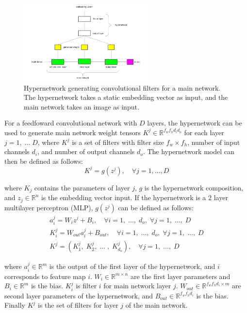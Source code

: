 \begin{figure} [H]
   	\centering
    	\includegraphics[width=0.6\textwidth, height=0.4\textwidth]{hypernetwork.png}
	\caption{Hypernetwork generating convolutional filters for a main network. The hypernetwork takes a static embedding vector as input, and the main network takes an image as input.}
\end{figure}

\noindent For a feedfoward convolutional network with $ D $ layers, the hypernetwork can be used to generate main network weight tensors $ K^j \in \mathbb{R}^{f_wf_hd_id_o} $ for each layer $ j = 1, \; \dots \; D $, where $ K^j $ is a set of filters with filter size $ f_w \times f_h $, number of input channels $ d_i $, and number of output channels $ d_o $. The hypernetwork model can then be defined as follows: 
\begin{equation}
	K^j = g(z^j), \quad \forall j = 1, \dots, D
\end{equation}

\noindent where $ K_j $ contains the parameters of layer $ j $, $ g $ is the hypernetwork composition, and $ z_j \in \mathbb{R}^n $ is the embedding vector input. If the hypernetwork is a $ 2 $ layer multilayer perceptron (MLP), $ g(z^j) $ can be defined as follows:  
\begin{subequations}
	\begin{gather}
		a_i^j = W_iz^j + B_i, \quad \forall i = 1, \; \dots, \; d_o, \; \forall j = 1, \; \dots, \; D \\
		K_i^j = W_{out}a_i^j + B_{out}, \quad \forall i = 1, \; \dots, \; d_o, \; \forall j = 1, \; \dots, \; D \\
		K^j = (K_1^j, \; K_2^j, \; \dots \;, \; K_{d_o}^j), \quad \forall j = 1, \; \dots, \; D
	\end{gather}
\end{subequations}

\noindent where $ a_i^j \in \mathbb{R}^{m} $ is the output of the first layer of the hypernetwork, and $ i $ corresponds to feature map $ i $. $ W_i \in \mathbb{R}^{m \times n} $ are the first layer parameters and $ B_i \in \mathbb{R}^m $ is the bias. $ K_i^j $ is filter $ i $ for main network layer $ j $. $ W_{out} \in \mathbb{R}^{f_w f_hd_i \times m} $ are second layer parameters of the hypernetwork, and $ B_{out} \in \mathbb{R}^{f_wf_hd_i} $ is the bias. Finally $ K^j $ is the set of filters for layer $ j $ of the main network. \par

